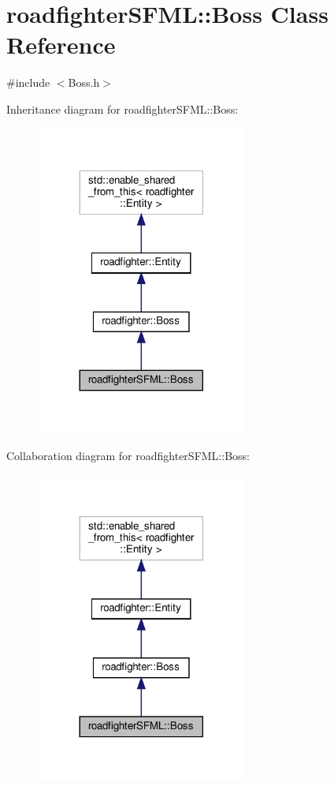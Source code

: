 \hypertarget{classroadfighterSFML_1_1Boss}{}\section{roadfighter\+S\+F\+ML\+:\+:Boss Class Reference}
\label{classroadfighterSFML_1_1Boss}


{\ttfamily \#include $<$Boss.\+h$>$}



Inheritance diagram for roadfighter\+S\+F\+ML\+:\+:Boss\+:\nopagebreak
\begin{figure}[H]
\begin{center}
\leavevmode
\includegraphics[width=197pt]{classroadfighterSFML_1_1Boss__inherit__graph}
\end{center}
\end{figure}


Collaboration diagram for roadfighter\+S\+F\+ML\+:\+:Boss\+:\nopagebreak
\begin{figure}[H]
\begin{center}
\leavevmode
\includegraphics[width=197pt]{classroadfighterSFML_1_1Boss__coll__graph}
\end{center}
\end{figure}
